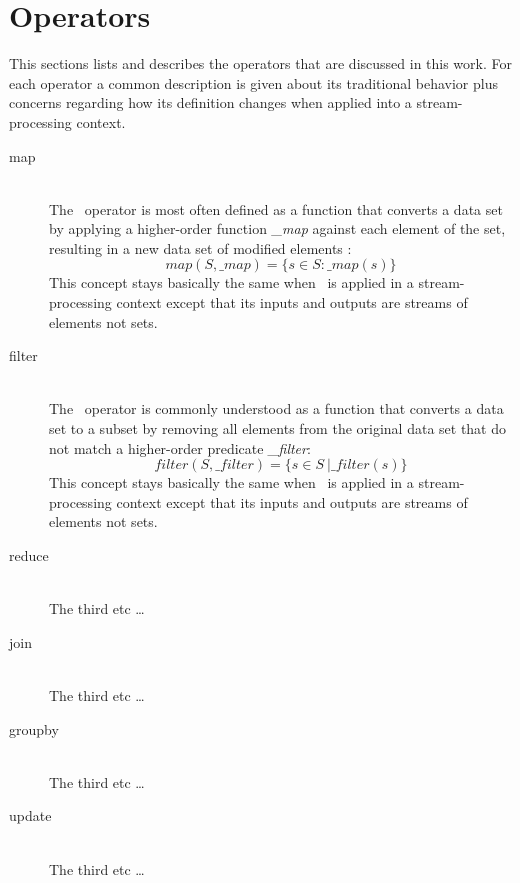 \section{Operators}
\label{sect:operators}
This sections lists and describes the operators that are discussed in this work.
For each operator a common description is given about its traditional behavior plus concerns regarding how its definition changes when applied into a stream-processing context.
\begin{description}
  \item[map] \hfill \\
  The \map\ operator is most often defined as a function that converts a data set by applying a higher-order function \textsl{\_map} against each element of the set, resulting in a new data set of modified elements \cite{Wiki:Map}:
	$$map\left(S, \_map\right)=\{s\in S : \_map(s)\}$$
	This concept stays basically the same when \map\ is applied in a stream-processing context except that its inputs and outputs are streams of elements not sets.
  \item[filter] \hfill \\
  The \filter\ operator is commonly understood as a function that converts a data set to a subset by removing all elements from the original data set that do not match a higher-order predicate \textsl{\_filter}\cite{Wiki:Filter}:
	$$filter\left(S, \_filter\right)=\{s\in S\ | \_filter\left(s\right)\}$$
	This concept stays basically the same when \filter\ is applied in a stream-processing context except that its inputs and outputs are streams of elements not sets.
  \item[reduce] \hfill \\
  The third etc \ldots
	\item[join] \hfill \\
  The third etc \ldots
	\item[groupby] \hfill \\
  The third etc \ldots
	\item[update] \hfill \\
  The third etc \ldots
\end{description}


